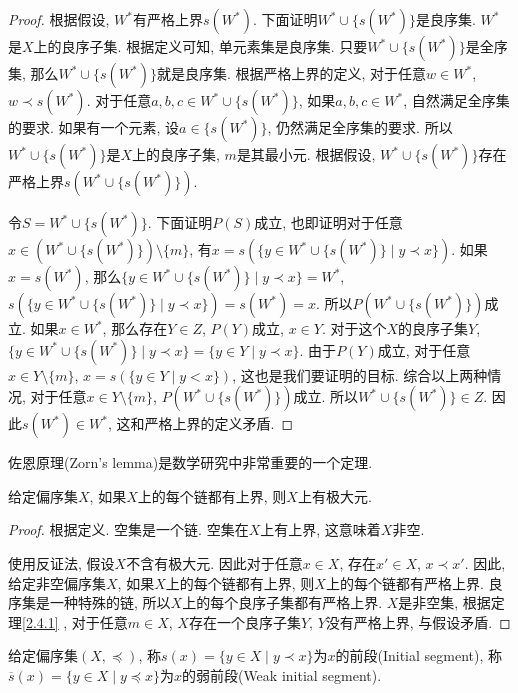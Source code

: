 \begin{proof}
	根据假设, $W^*$有严格上界$s(W^*)$. 下面证明$W^*\cup \{s(W^*)\}$是良序集. $W^*$是$X$上的良序子集. 根据定义可知, 单元素集是良序集. 只要$W^*\cup \{s(W^*)\}$是全序集, 那么$W^*\cup \{s(W^*)\}$就是良序集. 根据严格上界的定义, 对于任意$w\in W^*$, $w\prec s(W^*)$. 对于任意$a,b,c\in W^*\cup \{s(W^*)\}$, 如果$a,b,c\in W^*$, 自然满足全序集的要求. 如果有一个元素, 设$a\in \{s(W^*)\}$, 仍然满足全序集的要求. 所以$W^*\cup \{s(W^*)\}$是$X$上的良序子集, $m$是其最小元. 根据假设, $W^*\cup \{s(W^*)\}$存在严格上界$s(W^*\cup \{s(W^*)\})$.
	
	令$S=W^*\cup \{s(W^*)\}$. 下面证明$P(S)$成立, 也即证明对于任意$x\in (W^*\cup \{s(W^*)\})\setminus \{m\}$, 有$x=s(\{y\in W^*\cup \{s(W^*)\}\mid y\prec x\})$. 如果$x=s(W^*)$, 那么$\{y\in W^*\cup \{s(W^*)\}\mid y\prec x\}=W^*$, $s(\{y\in W^*\cup \{s(W^*)\}\mid y\prec x\})=s(W^*)=x$. 所以$P(W^*\cup \{s(W^*)\})$成立. 如果$x\in W^*$, 那么存在$Y\in Z$, $P(Y)$成立, $x\in Y$. 对于这个$X$的良序子集$Y$, $\{y\in W^*\cup \{s(W^*)\}\mid y\prec x\}=\{y\in Y\mid y\prec x\}$. 由于$P(Y)$成立, 对于任意$x\in Y\setminus \{m\}$, $x=s(\{y\in Y\mid y<x\})$, 这也是我们要证明的目标. 综合以上两种情况, 对于任意$x\in Y\setminus \{m\}$, $P(W^*\cup \{s(W^*)\})$成立. 所以$W^*\cup \{s(W^*)\}\in Z$. 因此$s(W^*)\in W^*$, 这和严格上界的定义矛盾.
\end{proof}

佐恩原理(Zorn's lemma)是数学研究中非常重要的一个定理.

\begin{lemma}[佐恩引理]
	给定偏序集$X$, 如果$X$上的每个链都有上界, 则$X$上有极大元.
\end{lemma}

\begin{proof}
	根据定义. 空集是一个链. 空集在$X$上有上界, 这意味着$X$非空.
	
	使用反证法, 假设$X$不含有极大元. 因此对于任意$x\in X$, 存在$x'\in X$, $x\prec x'$. 因此, 给定非空偏序集$X$, 如果$X$上的每个链都有上界, 则$X$上的每个链都有严格上界. 良序集是一种特殊的链, 所以$X$上的每个良序子集都有严格上界. $X$是非空集, 根据定理\ref{2.4.1} , 对于任意$m\in X$, $X$存在一个良序子集$Y$, $Y$没有严格上界, 与假设矛盾.
\end{proof}

\begin{definition}
	给定偏序集$(X,\preccurlyeq)$, 称$s(x)=\{y\in X\mid y\prec x\}$为$x$的前段(Initial segment), 称$\overline s(x)=\{y\in X\mid y\preccurlyeq x\}$为$x$的弱前段(Weak initial segment).
\end{definition}

